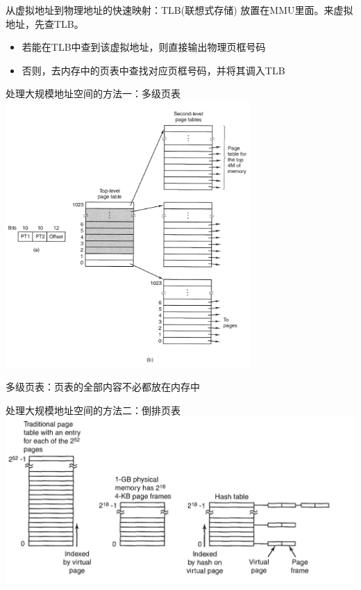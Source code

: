 \documentclass[xcolor=svgnames]{beamer}
\begin{document}
\begin{CJK*}{UTF8}{gbsn}
\begin{frame}{从虚拟地址到物理地址的快速映射：TLB(联想式存储)}
放置在MMU里面。来虚拟地址，先查TLB。
\begin{itemize}
\item 若能在TLB中查到该虚拟地址，则直接输出物理页框号码
\item 否则，去内存中的页表中查找对应页框号码，并将其调入TLB
\end{itemize}
\end{frame}

\begin{frame}{处理大规模地址空间的方法一：多级页表}
\includegraphics[width=0.7\textwidth]{multi.png}

多级页表：页表的全部内容不必都放在内存中
\end{frame}

\begin{frame}{处理大规模地址空间的方法二：倒排页表}
\includegraphics[width=1.0\textwidth]{inverted.png}
\end{frame}


\end{CJK*}
\end{document}
